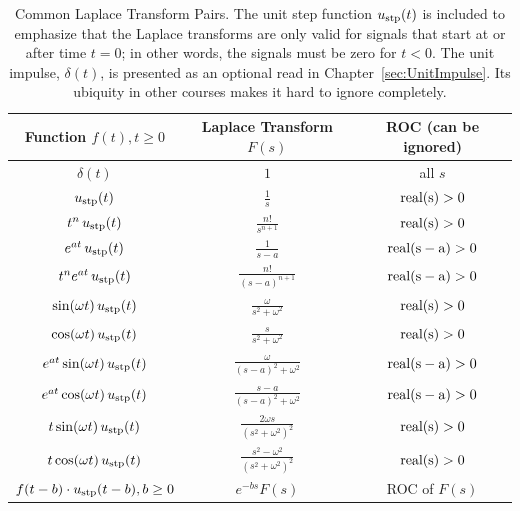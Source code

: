 \begin{table}[htbp]
\centering
\renewcommand{\arraystretch}{1.8} %
\caption{Common Laplace Transform Pairs. The unit step function $u_{\rm stp}(t)$ is included to emphasize that the Laplace transforms are only valid for signals that start at or after time $t=0$; in other words, the signals must be zero for $ t < 0$. The unit impulse,  $\delta(t)$, is presented as an optional read in Chapter~\ref{sec:UnitImpulse}. Its ubiquity in other courses makes it hard to ignore completely.}
\begin{tabular}{|c|c|c|}
\hline
\textbf{Function $f(t), t \ge 0$} & \textbf{Laplace Transform $F(s)$} & \textbf{ROC} (can be ignored)\\
\hline
$\delta(t)$ & $1$ & all $s$ \\
\hline
$u_{\rm stp}(t)$ & $\frac{1}{s}$ & ${\rm real(s)} >0$ \\
\hline
$t^n\, u_{\rm stp}(t)$ & $\frac{n!}{s^{n+1}}$  & ${\rm real(s)} >0$\\
\hline
$e^{at}\, u_{\rm stp}(t)$ & $\frac{1}{s-a}$ &  ${\rm real(s-a)} >0$ \\
\hline
$t^n e^{at} \, u_{\rm stp}(t)$  & $\frac{n!}{(s-a)^{n+1}} $ &  ${\rm real(s-a)} >0$ \\
\hline
$\sin(\omega t)\, u_{\rm stp}(t)$ & $\frac{\omega}{s^2+\omega^2}$ & ${\rm real(s)} >0$ \\
\hline
$\cos(\omega t)\, u_{\rm stp}(t)$ & $\frac{s}{s^2+\omega^2}$  & ${\rm real(s)} >0$ \\
\hline
$e^{at}\sin(\omega t)\, u_{\rm stp}(t)$ & $\frac{\omega}{(s-a)^2+\omega^2}$  & ${\rm real(s-a)} >0 $\\
\hline
$e^{at}\cos(\omega t)\, u_{\rm stp}(t)$ & $\frac{s-a}{(s-a)^2+\omega^2}$ &  ${\rm real(s-a)} >0$ \\
\hline
$t \sin(\omega t) \, u_{\rm stp}(t)$ & $ \frac{2 \omega s}{(s^2 + \omega^2)^2}$  & ${\rm real(s)} >0$ \\
\hline
$t \cos(\omega t)\, u_{\rm stp}(t)$ & $\frac{s^2 - \omega^2}{(s^2 + \omega^2)^2}$ &  ${\rm real(s)} >0$ \\
\hline
$f(t-b)\cdot u_{\rm stp}(t-b), b \ge 0$ & $e^{-bs}F(s)$ & ROC of $F(s)$ \\
\hline
\end{tabular}
\label{tab:LaplaceTransformPairs}
\end{table}


